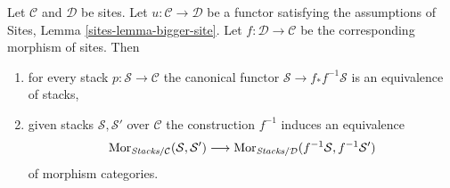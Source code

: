 \begin{lemma}
\label{lemma-bigger-site}
Let $\mathcal{C}$ and $\mathcal{D}$ be sites.
Let $u : \mathcal{C} \to \mathcal{D}$ be a functor satisfying the
assumptions of
Sites, Lemma \ref{sites-lemma-bigger-site}.
Let $f : \mathcal{D} \to \mathcal{C}$ be the corresponding
morphism of sites. Then
\begin{enumerate}
\item for every stack $p : \mathcal{S} \to \mathcal{C}$ the
canonical functor $\mathcal{S} \to f_*f^{-1}\mathcal{S}$ is
an equivalence of stacks,
\item given stacks $\mathcal{S}, \mathcal{S}'$ over $\mathcal{C}$
the construction $f^{-1}$
induces an equivalence
$$
\mathop{\mathrm{Mor}}\nolimits_{\textit{Stacks}/\mathcal{C}}(\mathcal{S}, \mathcal{S}')
\longrightarrow
\mathop{\mathrm{Mor}}\nolimits_{\textit{Stacks}/\mathcal{D}}(f^{-1}\mathcal{S}, f^{-1}\mathcal{S}')
$$
of morphism categories.
\end{enumerate}
\end{lemma}


